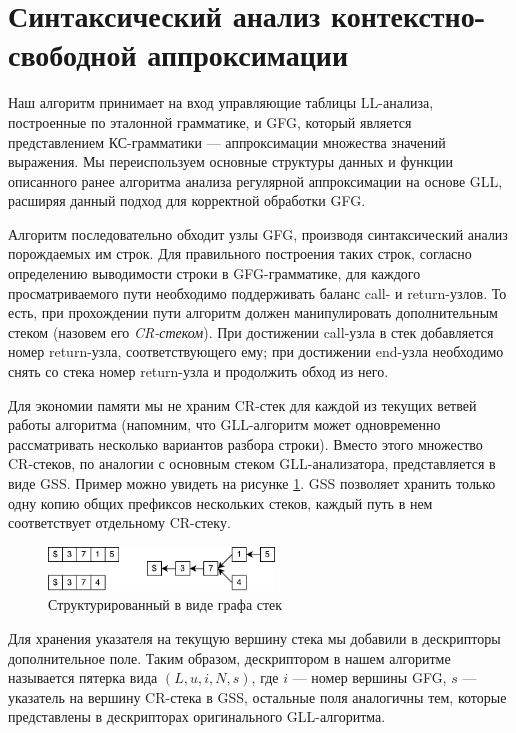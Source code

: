 \section{Синтаксический анализ контекстно-свободной аппроксимации}

Наш алгоритм принимает на вход управляющие таблицы LL-анализа, построенные по эталонной грамматике, и GFG, который является представлением КС-грамматики --- аппроксимации множества значений выражения. 
Мы переиспользуем основные структуры данных и функции описанного ранее алгоритма анализа регулярной аппроксимации на основе GLL, расширяя данный подход для корректной обработки GFG.

Алгоритм последовательно обходит узлы GFG, производя синтаксический анализ порождаемых им строк. 
Для правильного построения таких строк, согласно определению выводимости строки в GFG-грамматике, для каждого просматриваемого пути необходимо поддерживать баланс call- и return-узлов. 
То есть, при прохождении пути алгоритм должен манипулировать дополнительным стеком (назовем его \textit{CR-стеком}). 
При достижении call-узла в стек добавляется номер return-узла, соответствующего ему; при достижении end-узла необходимо снять со стека номер return-узла и продолжить обход из него. 

Для экономии памяти мы не храним CR-стек для каждой из текущих ветвей работы алгоритма (напомним, что GLL-алгоритм может одновременно рассматривать несколько вариантов разбора строки). 
Вместо этого множество CR-стеков, по аналогии с основным стеком GLL-анализатора, представляется в виде GSS. 
Пример можно увидеть на рисунке \ref{fig:gss}. GSS позволяет хранить только одну копию общих префиксов нескольких стеков, каждый путь в нем соответствует отдельному CR-стеку.

\begin{figure}[h]
	\centering
	\includegraphics[width=6cm]{pictures/gss_cr}
	\caption{Структурированный в виде графа стек}
	\label{fig:gss}
\end{figure}

Для хранения указателя на текущую вершину стека мы добавили в дескрипторы дополнительное поле. 
Таким образом, дескриптором в нашем алгоритме называется пятерка вида $(L, u, i, N, s)$, где $i$ --- номер вершины GFG, $s$ --- указатель на вершину CR-стека в GSS, остальные поля аналогичны тем, которые представлены в дескрипторах оригинального GLL-алгоритма.

